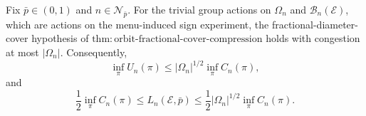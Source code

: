 Fix \(\bar p\in(0,1)\) and \(n\in\mathcal N_{\bar p}\). For the trivial group actions on \(\Omega_n\) and \(\mathcal B_n(\mathcal E)\), which are actions on the menu-induced sign experiment, the fractional-diameter-cover hypothesis of \(\mathrm{thm{:}orbit\text{-}fractional\text{-}cover\text{-}compression}\) holds with congestion at most \(|\Omega_n|\). Consequently,
\[
 \inf_\pi U_n(\pi)
 \le |\Omega_n|^{1/2}\inf_\pi C_n(\pi),
\]
and
\[
 \frac12\inf_\pi C_n(\pi)
 \le L_n(\mathcal E,\bar p)
 \le \frac12|\Omega_n|^{1/2}\inf_\pi C_n(\pi).
\]